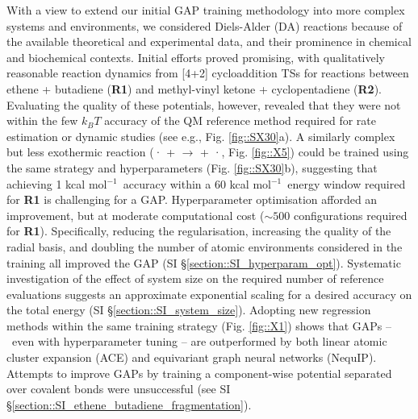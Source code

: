 \documentclass[twoside,twocolumn,9pt]{article}
\newcommand{\kcal}{kcal mol$^{-1}$}
\begin{document}
With a view to extend our initial GAP training methodology\cite{Young2021gap} into more complex systems and environments, we considered Diels-Alder (DA) reactions because of the available theoretical and experimental data,\cite{Black2012, Lording2020} and their prominence in chemical and biochemical contexts.\cite{Sato2021, MartCentelles2018, Briou2021} Initial efforts proved promising, with qualitatively reasonable reaction dynamics from [4+2] cycloaddition TSs for reactions between ethene + butadiene ({\bfseries{R1}}) and methyl-vinyl ketone + cyclopentadiene ({\bfseries{R2}}). Evaluating the quality of these potentials, however, revealed that they were not within the  few $k_BT$ accuracy of the QM reference method required for rate estimation or dynamic studies (see e.g., Fig. {\ref{fig::SX30}}a). A similarly complex but less exothermic reaction ({· +  $\rightarrow$  + ·}, Fig. {\ref{fig::X5}}) could be trained using the same strategy and hyperparameters (Fig. \ref{fig::SX30}b), suggesting that achieving 1 \kcal~accuracy within a 60 \kcal~energy window required for {\bfseries{R1}} is challenging for a GAP. Hyperparameter optimisation afforded an improvement, but at moderate computational cost ($\sim500$ configurations required for {\bfseries{R1}}). Specifically, reducing the regularisation, increasing the quality of the radial basis, and doubling the number of atomic environments considered in the training all improved the GAP (SI §\ref{section::SI_hyperparam_opt}). Systematic investigation of the effect of system size on the required number of reference evaluations suggests an approximate exponential scaling for a desired accuracy on the total energy (SI §\ref{section::SI_system_size}). Adopting new regression methods within the same training strategy (Fig. \ref{fig::X1}) shows that GAPs – even with hyperparameter tuning – are outperformed by both linear atomic cluster expansion (ACE\cite{Drautz2019}) and equivariant graph neural networks (NequIP\cite{Batzner2021}). Attempts to improve GAPs by training a component-wise potential separated over covalent bonds were unsuccessful (see SI §\ref{section::SI_ethene_butadiene_fragmentation}).
\end{document}
